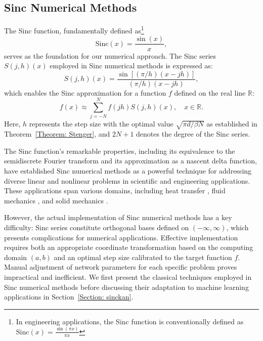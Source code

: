 \subsection{Sinc Numerical Methods}\label{section: sinc_numerical_methods}
The Sinc function, fundamentally defined as\footnote{In engineering applications, the Sinc function is conventionally defined as $\mathrm{Sinc}(x)=\frac{\sin(\pi x)}{\pi x}$}
\begin{equation}\label{eq:sinc}
    \mathrm{Sinc}(x)=\frac{\sin(x)}{x},
\end{equation}
serves as the foundation for our numerical approach. The Sinc series $S(j, h)(x)$ employed in Sinc numerical methods is expressed as:
\begin{equation}\label{candidate function}
S(j, h)(x)=\frac{\sin [(\pi / h)(x-j h)]}{(\pi / h)(x-j h)},    
\end{equation}
which enables the Sinc approximation for a function $f$ defined on the real line $\mathbb{R}$:
\begin{equation}\label{eq: sinc_approx}
f(x) \approx \sum_{j=-N}^N f(j h) S(j, h)(x), \quad x \in \mathbb{R}.
\end{equation}
Here, $h$ represents the step size with the optimal value $\sqrt{\pi d/\beta N}$ as established in Theorem~\ref{Theorem: Stenger}, and $2N+1$ denotes the degree of the Sinc series.

The Sinc function's remarkable properties, including its equivalence to the semidiscrete Fourier transform \citep{trefethen2000spectral} and its approximation as a nascent delta function, have established Sinc numerical methods as a powerful technique for addressing diverse linear and nonlinear problems in scientific and engineering applications. These applications span various domains, including heat transfer \citep{lippke1991analytical}, fluid mechanics \citep{abdella2015solving}, and solid mechanics \citep{abdella2009application}. 


However, the actual implementation of Sinc numerical methods has a key difficulty: Sinc series constitute orthogonal bases defined on $(-\infty,\infty)$, which presents complications for numerical applications. Effective implementation requires both an appropriate coordinate transformation based on the computing domain $(a,b)$ and an optimal step size calibrated to the target function $f$. Manual adjustment of network parameters for each specific problem proves impractical and inefficient. We first present the classical techniques employed in Sinc numerical methods before discussing their adaptation to machine learning applications in Section~\ref{Section: sinckan}. 

